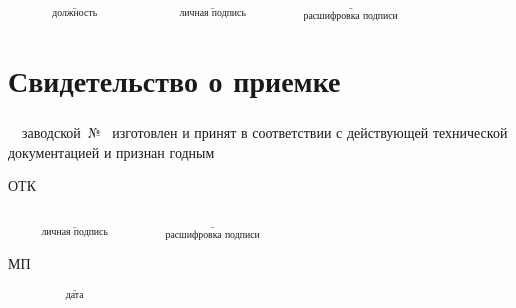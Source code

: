 		\vspace{0.5cm}
		
		$\underset{\text{должность}}{\underline{\hspace{4cm}}}$ \hspace{0.5cm}
		$\underset{\text{личная подпись}}{\underline{\hspace{4cm}}}$
		\hspace{0.5cm}
		$\underset{\text{расшифровка подписи}}{\underline{\hspace{4cm}}}$
		



\chapter{Свидетельство о приемке}


\paragraph{}  \devNameFull\ \decim\ заводской~№~\underline{\hspace{5cm}} изготовлен и принят в соответствии с действующей технической документацией и признан годным
	\noindent\underline{\hspace\textwidth}
	\noindent\underline{\hspace\textwidth}	
	\noindent\underline{\hspace\textwidth}
	\noindent\underline{\hspace\textwidth}
	\newline
			
		ОТК
		
		
		
		
		
		
		\hspace{7cm}$\underset{\text{личная подпись}}{\underline{\hspace{4cm}}}$
		\hspace{0.5cm}
		$\underset{\text{расшифровка подписи}}{\underline{\hspace{4cm}}}$
		
		\hspace{2cm}
		МП
		
		\hspace{7cm}$\underset{\text{дата}}{\underline{\hspace{4cm}}}$	\newline
		
		
		
